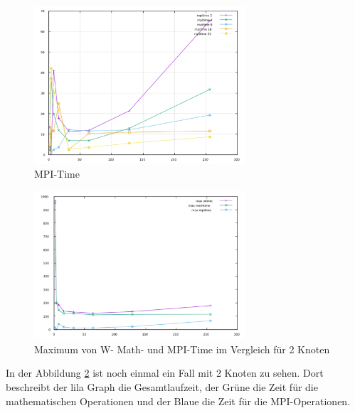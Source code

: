 \documentclass[
	12pt,			%
	a4paper,		%
	twoside,		%
	german,			%
	headsepline,		%
	footnosepline=true,		%
	automark,		%
	smallheadings,		%
	appendixprefix,		%
	openright,		%
	cleardoubleempty,	%
	abstracton,		%
	index=totoc,		%
	listof=totoc,		%
	bibliography=totoc,		%
 	BCOR8mm,		%
]{scrreprt}
\begin{document}
\begin{figure}[htbp]
\begin{center}
\caption{MPI-Time}
\label{fig:allmaxmpitime}
\includegraphics[width=0.7\textwidth]{all_maxmpitime}
\end{center}
\end{figure}
\begin{figure}[htbp]
\begin{center}
\caption{Maximum von W- Math- und MPI-Time im Vergleich für 2 Knoten}
\label{fig:2maxwtimemathtimempitime}
\includegraphics[width=0.7\textwidth]{2_maxwtimemaxmathtimmaxmpitime}
\end{center}
\end{figure}
In der Abbildung \ref{fig:2maxwtimemathtimempitime} ist noch einmal ein Fall mit 2 Knoten zu sehen. Dort beschreibt der lila Graph die Gesamtlaufzeit, der Grüne die Zeit für die mathematischen Operationen und der Blaue die Zeit für die MPI-Operationen. 
\end{document}
